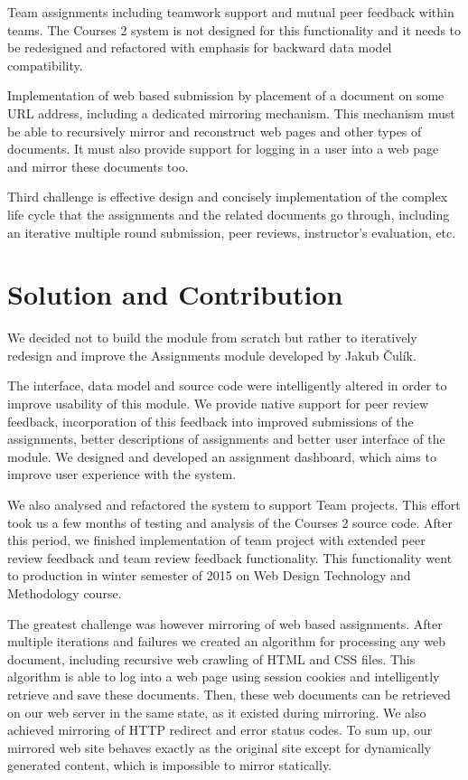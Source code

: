 Team assignments including teamwork support and mutual peer feedback within teams. The Courses 2 system is not designed for this functionality and it needs to be redesigned and refactored with emphasis for backward data model compatibility.

Implementation of web based submission by placement of a document on some URL address, including a dedicated mirroring mechanism. This mechanism must be able to recursively mirror and reconstruct web pages and other types of documents. It must also provide support for logging in a user into a web page and mirror these documents too. 

Third challenge is effective design and concisely implementation of the complex life cycle that the assignments and the related documents go through, including an iterative multiple round submission, peer reviews, instructor's evaluation, etc.


\section*{Solution and Contribution}
We decided not to build the module from scratch but rather to iteratively redesign and improve the Assignments module developed by Jakub \v{C}ul\'{i}k.

The interface, data model and source code were intelligently altered in order to improve usability of this module. We provide native support for peer review feedback, incorporation of this feedback into improved submissions of the assignments, better descriptions of assignments and better user interface of the module. We designed and developed an assignment dashboard, which aims to improve user experience with the system.

We also analysed and refactored the system to support Team projects. This effort took us a few months of testing and analysis of the Courses 2 source code. After this period, we finished implementation of team project with extended peer review feedback and team review feedback functionality. This functionality went to production in winter semester of 2015 on Web Design Technology and Methodology course. 

The greatest challenge was however mirroring of web based assignments. After multiple iterations and failures we created an algorithm for processing any web document, including recursive web crawling of HTML and CSS files. This algorithm is able to log into a web page using session cookies and intelligently retrieve and save these documents. Then, these web documents can be retrieved on our web server in the same state, as it existed during mirroring. We also achieved mirroring of HTTP redirect and error status codes. To sum up, our mirrored web site behaves exactly as the original site except for dynamically generated content, which is impossible to mirror statically.

